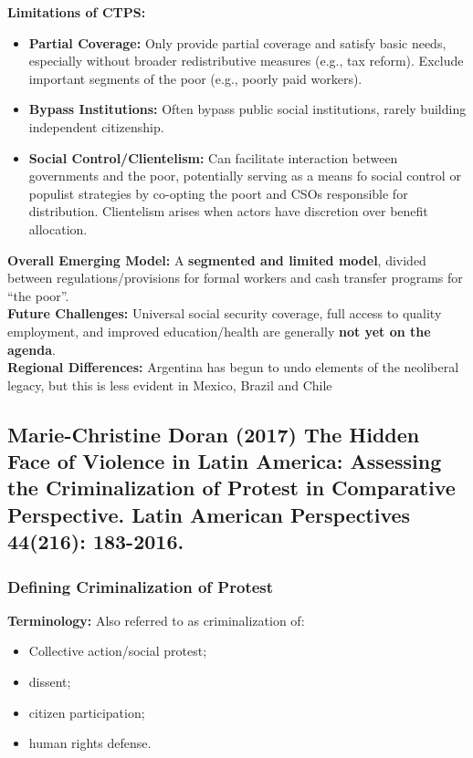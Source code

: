 \documentclass{article}
\begin{document}
    \noindent \textbf{Limitations of CTPS:}
    \begin{itemize}
        \item \textbf{Partial Coverage:} Only provide partial coverage and
        satisfy basic needs, especially without broader redistributive
        measures (e.g., tax reform). Exclude important segments of the
        poor (e.g., poorly paid workers).
        \item \textbf{Bypass Institutions:} Often bypass public social
        institutions, rarely building independent citizenship.
        \item \textbf{Social Control/Clientelism:} Can facilitate
        interaction between governments and the poor, potentially serving as
        a means fo social control or populist strategies by co-opting the
        poort and CSOs responsible for distribution. Clientelism arises when
        actors have discretion over benefit allocation.
    \end{itemize}

    \noindent \textbf{Overall Emerging Model:} A
\textbf{segmented and limited model}, divided between regulations/provisions
for formal workers and cash transfer programs for ``the poor''.\\

    \noindent \textbf{Future Challenges:} Universal social security
coverage, full access to quality employment, and improved education/health
are generally \textbf{not yet on the agenda}.\\

    \noindent \textbf{Regional Differences:} Argentina has begun to undo
elements of the neoliberal legacy, but this is less evident in Mexico,
Brazil and Chile

    \subsection{Marie-Christine Doran (2017) The Hidden Face of Violence in Latin America: Assessing the Criminalization of Protest in Comparative Perspective. Latin American Perspectives 44(216): 183-2016.}

    \subsubsection{Defining Criminalization of Protest}
    \noindent \textbf{Terminology:} Also referred to as criminalization of:
    \begin{itemize}
        \item Collective action/social protest;
        \item dissent;
        \item citizen participation;
        \item human rights defense.
    \end{itemize}
\end{document}
